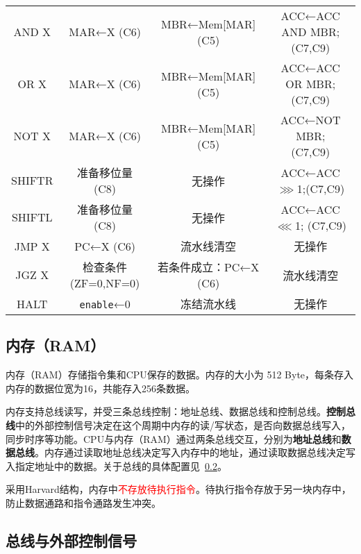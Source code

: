 \documentclass[lang=cn,a4paper,newtx]{elegantpaper}
\begin{document}
\begin{longtable}{cccc}
  AND X & 
  MAR←X \quad (C6) & 
  MBR←Mem[MAR] \quad (C5) & 
  \makecell{ACC←ACC AND MBR;\\ \quad (C7,C9)} \\
  
  OR X & 
  MAR←X \quad (C6) & 
  MBR←Mem[MAR] \quad (C5) & 
  \makecell{ACC←ACC OR MBR; \\\quad (C7,C9)} \\
  
  NOT X & 
  MAR←X \quad (C6) & 
  MBR←Mem[MAR] \quad (C5) & 
  \makecell{ACC←NOT MBR;\\ \quad (C7,C9)} \\
  \midrule

  SHIFTR & 
  准备移位量 \quad (C8) & 
  无操作 & 
  ACC←ACC$\ggg$1;\quad (C7,C9) \\
  
  SHIFTL & 
  准备移位量 \quad (C8) & 
  无操作 & 
  ACC←ACC$\lll$1;  \quad (C7,C9) \\
  \midrule

  JMP X & 
  PC←X \quad (C6) & 
  流水线清空 & 
  无操作 \\
  
  JGZ X & 
  检查条件(ZF=0,NF=0) & 
  若条件成立：PC←X \quad (C6) & 
  流水线清空 \\
  
  HALT & 
  \texttt{enable}←0 & 
  冻结流水线 & 
  无操作 \\
\end{longtable}





\subsection{内存（RAM）}
内存（RAM）存储指令集和CPU保存的数据。内存的大小为 512 Byte，每条存入内存的数据位宽为16，共能存入256条数据。

内存支持总线读写，并受三条总线控制：地址总线、数据总线和控制总线。\textbf{控制总线}中的外部控制信号决定在这个周期中内存的读/写状态，是否向数据总线写入，同步时序等功能。CPU与内存（RAM）通过两条总线交互，分别为\textbf{地址总线}和\textbf{数据总线}。内存通过读取地址总线决定写入内存中的地址，通过读取数据总线决定写入指定地址中的数据。关于总线的具体配置见~\ref{sec:ExternalControl}。

采用Harvard结构，内存中\textcolor{red}{不存放待执行指令}。待执行指令存放于另一块内存中，防止数据通路和指令通路发生冲突。
\subsection{总线与外部控制信号}\label{sec:ExternalControl}
\end{document}

